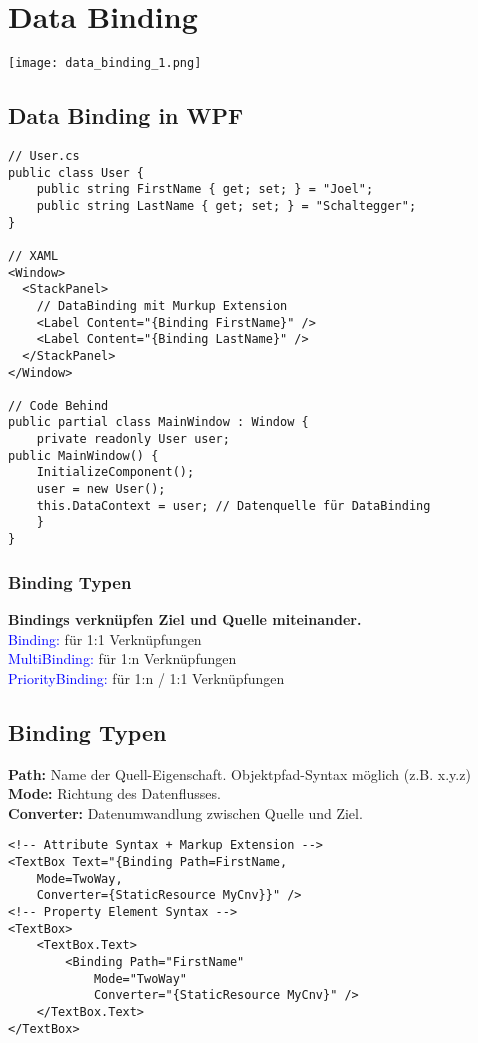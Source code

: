 
\section{Data Binding}
\texttt{[image: data\_binding\_1.png]}
\subsection{Data Binding in WPF}
\begin{lstlisting}
// User.cs
public class User {
    public string FirstName { get; set; } = "Joel";
    public string LastName { get; set; } = "Schaltegger";
}

// XAML
<Window>
  <StackPanel>
    // DataBinding mit Murkup Extension
    <Label Content="{Binding FirstName}" />
    <Label Content="{Binding LastName}" />
  </StackPanel>
</Window>

// Code Behind
public partial class MainWindow : Window {
    private readonly User user;
public MainWindow() {
    InitializeComponent();
    user = new User();
    this.DataContext = user; // Datenquelle für DataBinding
    }
}
\end{lstlisting}
\subsubsection{Binding Typen}
\textbf{Bindings verknüpfen Ziel und Quelle miteinander.}\\
\textcolor{blue}{Binding:} für 1:1 Verknüpfungen\\
\textcolor{blue}{MultiBinding:} für 1:n Verknüpfungen\\
\textcolor{blue}{PriorityBinding:} für 1:n / 1:1 Verknüpfungen

\subsection{Binding Typen}
\textbf{Path:} Name der Quell-Eigenschaft. Objektpfad-Syntax möglich (z.B. x.y.z)\\
\textbf{Mode:} Richtung des Datenflusses.\\
\textbf{Converter:} Datenumwandlung zwischen Quelle und Ziel.
\begin{lstlisting}
<!-- Attribute Syntax + Markup Extension -->
<TextBox Text="{Binding Path=FirstName,
    Mode=TwoWay,
    Converter={StaticResource MyCnv}}" />
<!-- Property Element Syntax -->
<TextBox>
    <TextBox.Text>
        <Binding Path="FirstName"
            Mode="TwoWay"
            Converter="{StaticResource MyCnv}" />
    </TextBox.Text>
</TextBox>
\end{lstlisting}
